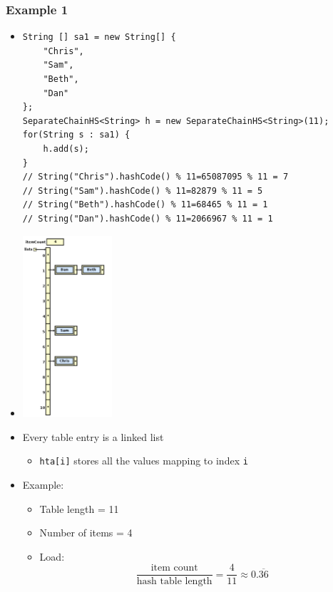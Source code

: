 \documentclass[10pt]{article}
\begin{document}
\subsubsection*{Example 1}
\setlength\columnsep{15em}
\begin{multicols}{2}
\begin{itemize}
    \item[] \begin{verbatim}
String [] sa1 = new String[] {
    "Chris",
    "Sam",
    "Beth",
    "Dan"
};
SeparateChainHS<String> h = new SeparateChainHS<String>(11);
for(String s : sa1) {
    h.add(s);
}
// String("Chris").hashCode() % 11=65087095 % 11 = 7
// String("Sam").hashCode() % 11=82879 % 11 = 5
// String("Beth").hashCode() % 11=68465 % 11 = 1
// String("Dan").hashCode() % 11=2066967 % 11 = 1
\end{verbatim}
\item[] \includegraphics[width=0.26\textwidth]{images/2.png}
\end{itemize}
\end{multicols}
\begin{itemize}
    \item Every table entry is a linked list
    \begin{itemize}
        \item \texttt{hta[i]} stores all the values mapping to index \texttt{i}
    \end{itemize}
    \item Example:
    \begin{itemize}
        \item Table length = 11
        \item Number of items = 4
        \item Load: $$\frac{\text{item count}}{\text{hash table length}} = \frac{4}{11} \approx 0.\overline{36}$$
    \end{itemize}
\end{itemize}
\end{document}
